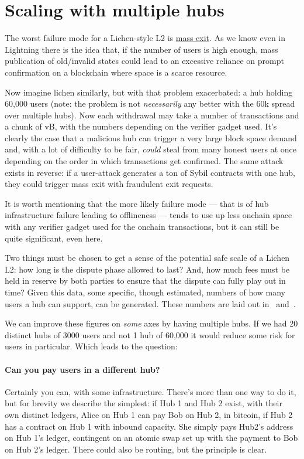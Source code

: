 \documentclass[11pt]{article}
\begin{document}
\section{Scaling with multiple hubs}
\label{sec:multihub}

The worst failure mode for a Lichen-style L2 is \underline{mass exit}. As we know even in Lightning there is the idea that, if the number of users is high enough, mass publication of old/invalid states could lead to an excessive reliance on prompt confirmation on a blockchain where space is a scarce resource.

Now imagine lichen similarly, but with that problem exacerbated: a hub holding 60,000 users (note: the problem is not \emph{necessarily} any better with the 60k spread over multiple hubs). Now each withdrawal may take a number of transactions and a chunk of vB, with the numbers depending on the verifier gadget used. It's clearly the case that a malicious hub can trigger a very large block space demand and, with a lot of difficulty to be fair, \emph{could} steal from many honest users at once depending on the order in which transactions get confirmed. The same attack exists in reverse: if a user-attack generates a ton of Sybil contracts with one hub, they could trigger mass exit with fraudulent exit requests.

It is worth mentioning that the more likely failure mode --- that is of hub infrastructure failure leading to offlineness --- tends to use up less onchain space with any verifier gadget used for the onchain transactions, but it can still be quite significant, even here.

Two things must be chosen to get a sense of the potential safe scale of a Lichen L2: how long is the dispute phase allowed to last? And, how much fees must be held in reserve by both parties to ensure that the dispute can fully play out in time? Given this data, some specific, though estimated, numbers of how many users a hub can support, can be generated. These numbers are laid out in~\cite{lichenbitvmx} and~\cite{lichenbabe}.

We can improve these figures on \emph{some} axes by having multiple hubs. If we had 20 distinct hubs of 3000 users and not 1 hub of 60,000 it would reduce some risk for users in particular. Which leads to the question:

\paragraph{ Can you pay users in a different hub?} Certainly you can, with some infrastructure. There's more than one way to do it, but for brevity we describe the simplest: if Hub 1 and Hub 2 exist, with their own distinct ledgers, Alice on Hub 1 can pay Bob on Hub 2, in bitcoin, if Hub 2 has a contract on Hub 1 with inbound capacity. She simply pays Hub2's address on Hub 1's ledger, contingent on an atomic swap set up with the payment to Bob on Hub 2's ledger. There could also be routing, but the principle is clear.
\end{document}
